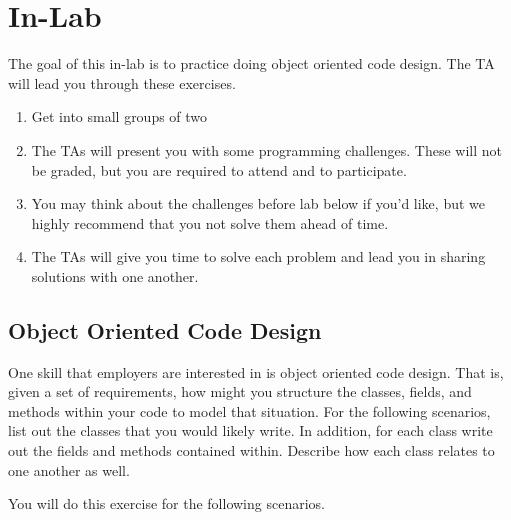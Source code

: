 \documentclass[paper=a4, fontsize=11pt, parskip=full]{scrartcl} %
\numberwithin{equation}{section} %
\numberwithin{figure}{section} %
\numberwithin{table}{section} %
\begin{document}
\section{In-Lab}

The goal of this in-lab is to practice doing object oriented code design. The TA will lead you through these exercises.

\begin{enumerate}
	\item Get into small groups of two
	\item The TAs will present you with some programming challenges. These will not be graded, but you are required to attend and to participate.
	\item You may think about the challenges before lab below if you'd like, but we highly recommend that you not solve them ahead of time.
	\item The TAs will give you time to solve each problem and lead you in sharing solutions with one another.
\end{enumerate}

\subsection{Object Oriented Code Design}

One skill that employers are interested in is object oriented code design. That is, given a set of requirements, how might you structure the classes, fields, and methods within your code to model that situation. For the following scenarios, list out the classes that you would likely write. In addition, for each class write out the fields and methods contained within. Describe how each class relates to one another as well.

You will do this exercise for the following scenarios.
\end{document}
